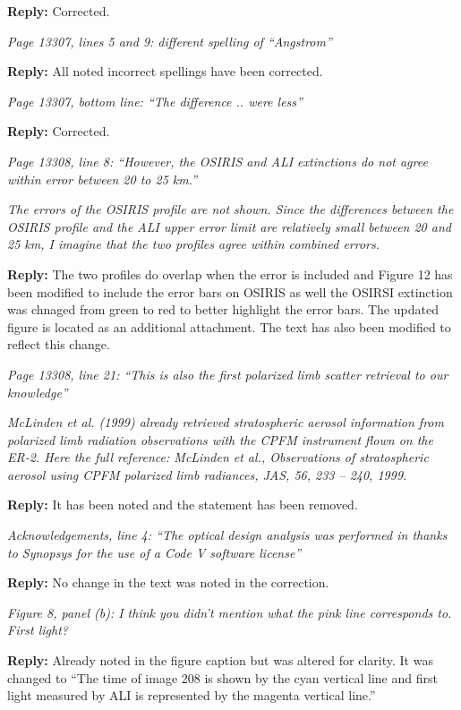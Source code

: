 \documentclass[12pt, notitlepage]{article}
\begin{document}
\textbf{Reply:} Corrected.

\hrulefill

\textit{Page 13307, lines 5 and 9: different spelling of ``Angstrom''}

\textbf{Reply:} All noted incorrect spellings have been corrected.

\hrulefill

\textit{Page 13307, bottom line: ``The difference .. were less''}

\textbf{Reply:} Corrected.

\hrulefill

\textit{Page 13308, line 8: ``However, the OSIRIS and ALI extinctions do not agree within error
between 20 to 25 km.''}

\textit{The errors of the OSIRIS profile are not shown. Since the differences between the
OSIRIS profile and the ALI upper error limit are relatively small between 20 and 25 km,
I imagine that the two profiles agree within combined errors.}

\textbf{Reply:} The two profiles do overlap when the error is included and Figure 12 has
been modified to include the error bars on OSIRIS as well the OSIRSI extinction was chnaged from green to red to better highlight the error bars. The updated figure is located as an additional attachment.
The text has also been modified to reflect this change.

\hrulefill

\textit{Page 13308, line 21: ``This is also the first polarized limb scatter retrieval to our knowledge''}

\textit{McLinden et al. (1999) already retrieved stratospheric aerosol information from polarized
limb radiation observations with the CPFM instrument flown on the ER-2. Here
the full reference: McLinden et al., Observations of stratospheric aerosol using CPFM
polarized limb radiances, JAS, 56, 233 – 240, 1999.}

\textbf{Reply:} It has been noted and the statement has been removed.

\hrulefill

\textit{Acknowledgements, line 4: ``The optical design analysis was performed in thanks to Synopsys for the use of a Code V software license''}

\textbf{Reply:} No change in the text was noted in the correction.

\hrulefill

\textit{Figure 8, panel (b): I think you didn't mention what the pink line corresponds to. First
light?}

\textbf{Reply:} Already noted in the figure caption but was altered for clarity. It was changed to ``The time of image 208 is shown by the
  cyan vertical line and first light measured by ALI is represented by the
  magenta vertical line.''

\hrulefill
\end{document}
